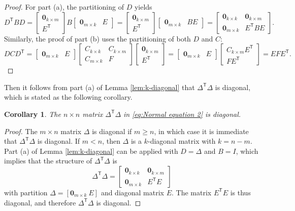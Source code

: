 \documentclass[12pt]{article}
\newcommand{\trans}[1]{{#1}^\mathsf{T}}	%
\newcommand{\zeroVec}{\bm{0}}	%
\newtheorem{corollary}{Corollary}[theorem]
\begin{document}
\begin{proof}
For part (a), the partitioning of $D$ yields
\[\trans{D}BD = \begin{bmatrix}
\zeroVec_{k \times m} \\
\trans{E}
\end{bmatrix}B\begin{bmatrix}
\zeroVec_{m \times k} & E
\end{bmatrix} = \begin{bmatrix}
\zeroVec_{k \times m} \\
\trans{E}
\end{bmatrix}\begin{bmatrix}
\zeroVec_{m \times k} & BE
\end{bmatrix} = 
\begin{bmatrix}
\zeroVec_{k \times k} & \zeroVec_{k \times m} \\
\zeroVec_{m \times k} & \trans{E}BE
\end{bmatrix}.\]
Similarly, the proof of part (b) uses the partitioning of both $D$ and $C$:
\[DC\trans{D} = 
\begin{bmatrix}
\zeroVec_{m \times k} & E
\end{bmatrix}
\begin{bmatrix}
C_{k \times k} & C_{k \times m} \\
C_{m \times k} & F
\end{bmatrix}
\begin{bmatrix}
\zeroVec_{k \times m} \\
\trans{E}
\end{bmatrix} = \begin{bmatrix}
\zeroVec_{m \times k} & E
\end{bmatrix}
\begin{bmatrix}
C_{k \times m}\trans{E} \\
F\trans{E}
\end{bmatrix} = EF\trans{E}.\]
\end{proof}
\noindent Then it follows from part (a) of Lemma \ref{lem:k-diagonal} that $\trans{\Delta}\Delta$ is diagonal, which is stated as the following corollary.

\begin{corollary}
\label{cor:Diagonal}
The $n \times n$ matrix $\trans{\Delta}\Delta$ in \eqref{eq:Normal equation 2} is diagonal.
\end{corollary}
\begin{proof}
The $m \times n$ matrix $\Delta$ is diagonal if $m \geq n$, in which case it is immediate that $\trans{\Delta}\Delta$ is diagonal. If $m < n$, then $\Delta$ is a $k$-diagonal matrix with $k = n - m$. Part (a) of Lemma \ref{lem:k-diagonal} can be applied with $D = \Delta$ and $B = I$, which implies that the structure of $\trans{\Delta}\Delta$ is
\[\trans{\Delta}\Delta = \begin{bmatrix}
\zeroVec_{k \times k} & \zeroVec_{k \times m} \\
\zeroVec_{m \times k} & \trans{E}E
\end{bmatrix}\]
with partition $\Delta = [\zeroVec_{m \times k} ~ E]$ and diagonal matrix $E$. The matrix $\trans{E}E$ is thus diagonal, and therefore $\trans{\Delta}\Delta$ is diagonal.
\end{proof}
\end{document}

